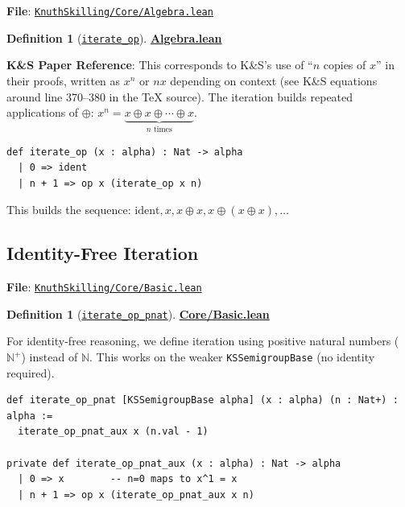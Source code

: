 \documentclass[11pt]{article}
\theoremstyle{definition}
\newtheorem{definition}[theorem]{Definition}
\theoremstyle{remark}
\begin{document}
\textbf{File}: \href{https://github.com/zariuq/ks-foundations-of-inference/blob/main/KnuthSkilling/Core/Algebra.lean}{\texttt{KnuthSkilling/Core/Algebra.lean}}

\begin{definition}[\href{https://github.com/zariuq/ks-foundations-of-inference/blob/main/KnuthSkilling/Core/Algebra.lean}{\texttt{iterate\_op}}]
\textbf{\href{https://github.com/zariuq/ks-foundations-of-inference/blob/main/KnuthSkilling/Core/Algebra.lean}{Algebra.lean}}

\textbf{K\&S Paper Reference}: This corresponds to K\&S's use of ``$n$ copies of $x$'' in their proofs,
written as $x^n$ or $nx$ depending on context (see K\&S equations around line 370--380 in the TeX source).
The iteration builds repeated applications of $\oplus$: $x^n = \underbrace{x \oplus x \oplus \cdots \oplus x}_{n \text{ times}}$.
\end{definition}

\begin{lstlisting}[caption={Iteration definition}]
def iterate_op (x : alpha) : Nat -> alpha
  | 0 => ident
  | n + 1 => op x (iterate_op x n)
\end{lstlisting}

This builds the sequence: $\text{ident}, x, x \oplus x, x \oplus (x \oplus x), \ldots$

\subsection{Identity-Free Iteration}

\textbf{File}: \href{https://github.com/zariuq/ks-foundations-of-inference/blob/main/KnuthSkilling/Core/Basic.lean}{\texttt{KnuthSkilling/Core/Basic.lean}}

\begin{definition}[\href{https://github.com/zariuq/ks-foundations-of-inference/blob/main/KnuthSkilling/Core/Basic.lean}{\texttt{iterate\_op\_pnat}}]
\textbf{\href{https://github.com/zariuq/ks-foundations-of-inference/blob/main/KnuthSkilling/Core/Basic.lean}{Core/Basic.lean}}

For identity-free reasoning, we define iteration using positive natural numbers ($\mathbb{N}^+$) instead of $\mathbb{N}$. This works on the weaker \texttt{KSSemigroupBase} (no identity required).
\end{definition}

\begin{lstlisting}[caption={Identity-free iteration}]
def iterate_op_pnat [KSSemigroupBase alpha] (x : alpha) (n : Nat+) : alpha :=
  iterate_op_pnat_aux x (n.val - 1)

private def iterate_op_pnat_aux (x : alpha) : Nat -> alpha
  | 0 => x        -- n=0 maps to x^1 = x
  | n + 1 => op x (iterate_op_pnat_aux x n)
\end{lstlisting}
\end{document}
